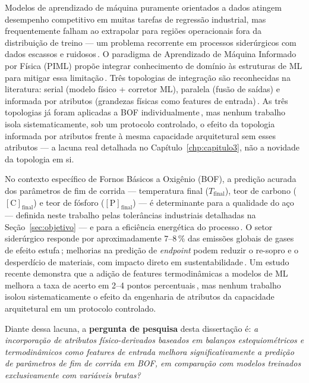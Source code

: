 Modelos de aprendizado de máquina puramente orientados a dados atingem desempenho competitivo em muitas tarefas de regressão industrial, mas frequentemente falham ao extrapolar para regiões operacionais fora da distribuição de treino --- um problema recorrente em processos siderúrgicos com dados escassos e ruidosos\,\cite{bae2020bof,willard2020integrating}. O paradigma de Aprendizado de Máquina Informado por Física (PIML) propõe integrar conhecimento de domínio às estruturas de ML para mitigar essa limitação\,\cite{raissi2019pinns,karniadakis2021physics,cuomo2022physics}. Três topologias de integração são reconhecidas na literatura: serial (modelo físico + corretor ML), paralela (fusão de saídas) e informada por atributos (grandezas físicas como features de entrada)\,\cite{willard2020integrating,chattopadhyay2022hybrid}. As três topologias já foram aplicadas a BOF individualmente\,\cite{xia2024dmpinn,chattopadhyay2022hybrid,shao2024hybrid,bae2020bof}, mas nenhum trabalho isola sistematicamente, sob um protocolo controlado, o efeito da topologia informada por atributos frente à mesma capacidade arquitetural sem esses atributos --- a lacuna real detalhada no Capítulo~\ref{chp:capitulo3}, não a novidade da topologia em si.

No contexto específico de Fornos Básicos a Oxigênio (BOF), a predição acurada dos parâmetros de fim de corrida --- temperatura final ($T_\text{final}$), teor de carbono ($[\text{C}]_\text{final}$) e teor de fósforo ($[\text{P}]_\text{final}$) --- é determinante para a qualidade do aço --- definida neste trabalho pelas tolerâncias industriais detalhadas na Seção~\ref{sec:objetivo} --- e para a eficiência energética do processo\,\cite{bae2020bof,zhou2024bof}. O setor siderúrgico responde por aproximadamente 7--8\,\% das emissões globais de gases de efeito estufa\,\cite{worldsteel2025climate}; melhorias na predição de \textit{endpoint} podem reduzir o re-sopro e o desperdício de materiais, com impacto direto em sustentabilidade\,\cite{chattopadhyay2022hybrid}. Um estudo recente demonstra que a adição de features termodinâmicas a modelos de ML melhora a taxa de acerto em 2--4 pontos percentuais\,\cite{bae2020bof}, mas nenhum trabalho isolou sistematicamente o efeito da engenharia de atributos da capacidade arquitetural em um protocolo controlado.

Diante dessa lacuna, a \textbf{pergunta de pesquisa} desta dissertação é: \textit{a incorporação de atributos físico-derivados baseados em balanços estequiométricos e termodinâmicos como features de entrada melhora significativamente a predição de parâmetros de fim de corrida em BOF, em comparação com modelos treinados exclusivamente com variáveis brutas?}

